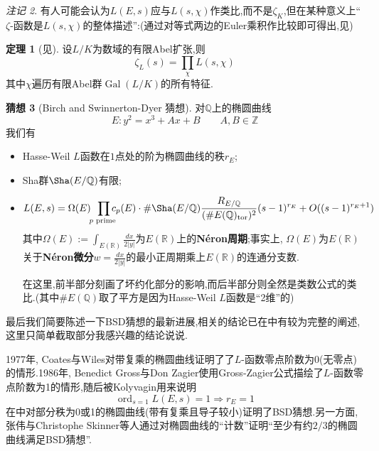 \documentclass[12pt,A4paper,oneside,reqno]{amsart}
\numberwithin{equation}{section}
\theoremstyle{definition}
\newtheorem{theorem}{定理}[section]
\newtheorem{conj}[theorem]{猜想}
\theoremstyle{plain}
\theoremstyle{plain}
\numberwithin{equation}{section}
\theoremstyle{remark}
\newtheorem{remark}[theorem]{注记}
\DeclareMathOperator{\tor}{\operatorname{tor}}
\newcommand{\Gal}{\operatorname{Gal}}
\newcommand{\ord}{\operatorname{ord}}
\begin{document}
\begin{remark}
	有人可能会认为$L(E,s)$应与$L(s, \chi)$作类比,而不是$\zeta_K$,但在某种意义上“$\zeta$-函数是$L(s,\chi)$的整体描述”:(通过对等式两边的Euler乘积作比较即可得出,见{\cite[p196-197]{冯克勤2000代数数论}})%
	\begin{theorem}[见{\cite[p248, 定理8.15]{fermat2013dream}}]
		设$L/K$为数域的有限Abel扩张,则
		$$\zeta_L(s)=\prod_{\chi}L(s,\chi)$$
		其中$\chi$遍历有限Abel群$\Gal(L/K)$的所有特征.%
	\end{theorem}
\end{remark}
\begin{conj}[Birch and Swinnerton-Dyer 猜想]对$\mathbb{Q}$上的椭圆曲线$$E:y^2=x^3+Ax+B \qquad A,B \in \mathbb{Z}$$
	我们有
	\begin{itemize}
			\item Hasse-Weil $L$函数在$1$点处的阶为椭圆曲线的秩$r_E$;
		\item Sha群$\Sha(E/\mathbb{Q})$有限;
		\item $$L(E,s)=\Omega(E)\!\! \prod_{p \text{ prime }}\hspace{-3mm}c_p(E)\cdot \#\Sha(E/\mathbb{Q})\frac{R_{E/\mathbb{Q}}}{(\#E(\mathbb{Q})_{\tor})^2} (s-1)^{r_{\scriptscriptstyle E}}+O((s-1)^{r_{\scriptscriptstyle E}+1})$$
		其中$\Omega(E):=\int_{E(\mathbb{R})} \frac{dx}{2|y|}$为$E(\mathbb{R})$上的\textbf{N\'{e}ron周期};事实上, $\Omega(E)$为$E(\mathbb{R})$关于\textbf{N\'{e}ron微分}$w=\frac{dx}{2|y|}$的最小正周期乘上$E(\mathbb{R})$的连通分支数.
		
		在这里,前半部分刻画了坏约化部分的影响,而后半部分则全然是类数公式的类比.(其中$\#E(\mathbb{Q})$取了平方是因为Hasse-Weil $L$函数是“2维”的)
	\end{itemize}
\end{conj}
最后我们简要陈述一下BSD猜想的最新进展,相关的结论已在\cite{zhang2013birch}中有较为完整的阐述,这里只简单截取部分我感兴趣的结论说说.

1977年, Coates与Wiles对带复乘的椭圆曲线证明了了$L$-函数零点阶数为0(无零点)的情形.1986年, Benedict Gross与Don Zagier使用Gross-Zagier公式描绘了$L$-函数零点阶数为1的情形,随后被Kolyvagin用来说明
$$\ord_{s=1}L(E,s)=1 \Longrightarrow r_E=1$$
在\cite{miller2011proving}中对部分秩为0或1的椭圆曲线(带有复乘且导子较小)证明了BSD猜想.另一方面,张伟与Christophe  Skinner等人通过对椭圆曲线的“计数”证明“至少有约$2/3$的椭圆曲线满足BSD猜想”.
\end{document}
